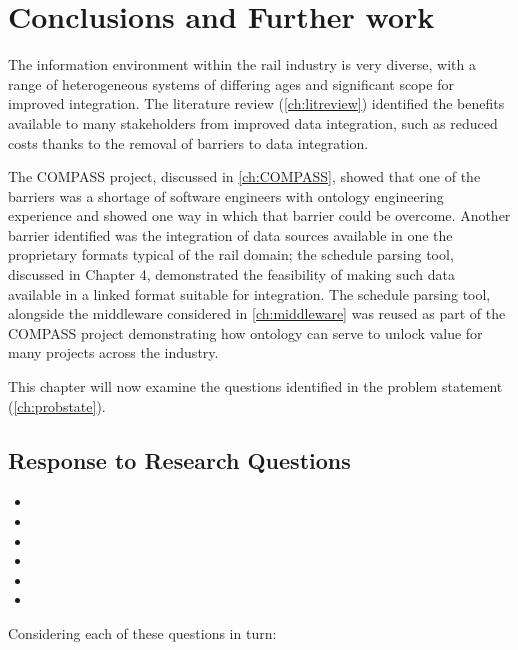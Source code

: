 \chapter{Conclusions and Further work}\label{ch:Conclusions}
The information environment within the rail industry is very diverse, with a range of heterogeneous systems of differing ages and significant scope for improved integration. The literature review (\autoref{ch:litreview}) identified the benefits available to many stakeholders from improved data integration, such as reduced costs thanks to the removal of barriers to data integration. 

The COMPASS project, discussed in \autoref{ch:COMPASS}, showed that one of the barriers was a shortage of software engineers with ontology engineering experience and showed one way in which that barrier could be overcome. Another barrier identified was the integration of data sources available in one the proprietary formats typical of the rail domain; the schedule parsing tool, discussed in Chapter 4, demonstrated the feasibility of making such data available in a linked format suitable for integration. The schedule parsing tool, alongside the middleware considered in \autoref{ch:middleware} was reused as part of the COMPASS project demonstrating how ontology can serve to unlock value for many projects across the industry.

This chapter will now examine the questions identified in the problem statement (\autoref{ch:probstate}).

\section{Response to Research Questions}

\begin{itemize}
	\item \QuestionOtherData
	\item \QuestionSkillz 	
	\item \QuestionCombine
	\item \QuestionChange
	\item \QuestionCanOntologyScale
	\item \QuestionSecurity		
\end{itemize}

Considering each of these questions in turn:

